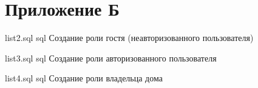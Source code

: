 \chapter*{Приложение Б}

{list2.sql}
{sql}
{Создание роли гостя (неавторизованного пользователя)}

{list3.sql}
{sql}
{Создание роли авторизованного пользователя}

{list4.sql}
{sql}
{Создание роли владельца дома}